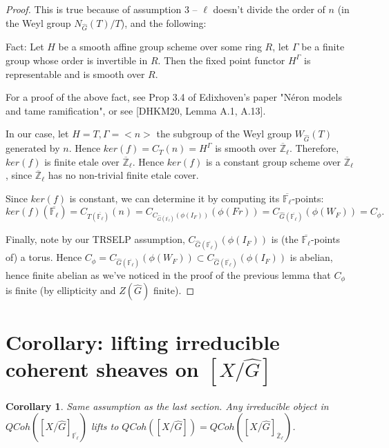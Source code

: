 \documentclass{article}
\newtheorem{corollary}{Corollary}
\begin{document}
	\begin{proof}
		This is true because of assumption 3 -- $\ell$ doesn't divide the order of $n$ (in the Weyl group $N_{\hat{G}}(T)/T$), and the following:
		
		Fact: Let $H$ be a smooth affine group scheme over some ring $R$, let $\Gamma$ be a finite group whose order is invertible in $R$. Then the fixed point functor $H^{\Gamma}$ is representable and is smooth over $R$.
		
		For a proof of the above fact, see Prop 3.4 of Edixhoven's paper "Néron models and tame ramification", or see [DHKM20, Lemma A.1, A.13].
		
		In our case, let $H=T, \Gamma=<n>$ the subgroup of the Weyl group $W_{\hat{G}}(T)$ generated by $n$. Hence $ker(f)=C_{T}(n)=H^{\Gamma}$ is smooth over $\overline{\mathbb{Z}}_{\ell}$. Therefore, $ker(f)$ is finite etale over $\overline{\mathbb{Z}}_{\ell}$. Hence $ker(f)$ is a constant group scheme over $\overline{\mathbb{Z}}_{\ell}$, since $\overline{\mathbb{Z}}_{\ell}$ has no non-trivial finite etale cover. 
		
		Since $ker(f)$ is constant, we can determine it by computing its $\overline{\mathbb{F}_{\ell}}$-points: $$ker(f)(\overline{\mathbb{F}_{\ell}})=C_{T(\overline{\mathbb{F}_{\ell}})}(n)=C_{C_{\hat{G}(\overline{\mathbb{F}_{\ell}})}(\phi(I_F))}(\phi(Fr))=C_{\hat{G}(\overline{\mathbb{F}_{\ell}})}(\phi(W_F))=C_{\phi}.$$
		
		Finally, note by our TRSELP assumption, $C_{\hat{G}(\overline{\mathbb{F}_{\ell}})}(\phi(I_F))$ is (the $\overline{\mathbb{F}_{\ell}}$-points of) a torus. Hence $C_\phi=C_{\hat{G}(\overline{\mathbb{F}_{\ell}})}(\phi(W_F)) \subset C_{\hat{G}(\overline{\mathbb{F}_{\ell}})}(\phi(I_F))$ is abelian, hence finite abelian as we've noticed in the proof of the previous lemma that $C_{\phi}$ is finite (by ellipticity and $Z(\hat{G})$ finite).
	\end{proof}
	
	\section{Corollary: lifting irreducible coherent sheaves on $[X/\hat{G}]$}
	\begin{corollary}
		Same assumption as the last section. Any irreducible object in $QCoh([X/\hat{G}]_{\overline{\mathbb{F}_{\ell}}})$ lifts to $QCoh([X/\hat{G}])=QCoh([X/\hat{G}]_{\overline{\mathbb{Z}}_{\ell}})$.
	\end{corollary}
	
\end{document}
